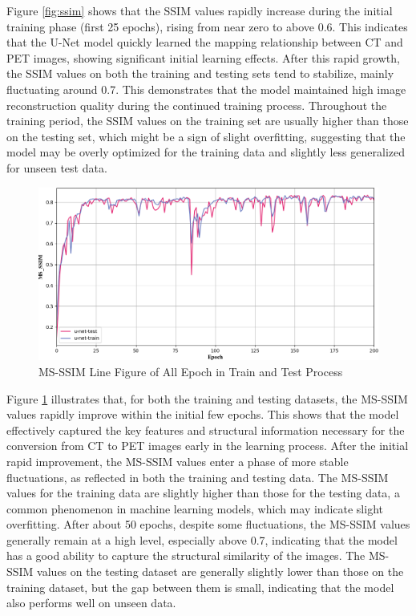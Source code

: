 \documentclass[twocolumn]{article}
\begin{document}
Figure \ref{fig:ssim} shows that the SSIM values rapidly increase during the initial training phase (first 25 epochs), rising from near zero to above 0.6. This indicates that the U-Net model quickly learned the mapping relationship between CT and PET images, showing significant initial learning effects. After this rapid growth, the SSIM values on both the training and testing sets tend to stabilize, mainly fluctuating around 0.7. This demonstrates that the model maintained high image reconstruction quality during the continued training process. Throughout the training period, the SSIM values on the training set are usually higher than those on the testing set, which might be a sign of slight overfitting, suggesting that the model may be overly optimized for the training data and slightly less generalized for unseen test data.


\begin{figure}[h]
	\centering
	\includegraphics[width=1.0\linewidth]{u-net/MS_SSIM}
	\caption[msssim]{MS-SSIM Line Figure of All Epoch in Train and Test Process}
	\label{fig:msssim}
\end{figure}

Figure \ref{fig:msssim} illustrates that, for both the training and testing datasets, the MS-SSIM values rapidly improve within the initial few epochs. This shows that the model effectively captured the key features and structural information necessary for the conversion from CT to PET images early in the learning process. After the initial rapid improvement, the MS-SSIM values enter a phase of more stable fluctuations, as reflected in both the training and testing data. The MS-SSIM values for the training data are slightly higher than those for the testing data, a common phenomenon in machine learning models, which may indicate slight overfitting. After about 50 epochs, despite some fluctuations, the MS-SSIM values generally remain at a high level, especially above 0.7, indicating that the model has a good ability to capture the structural similarity of the images. The MS-SSIM values on the testing dataset are generally slightly lower than those on the training dataset, but the gap between them is small, indicating that the model also performs well on unseen data.
\end{document}
